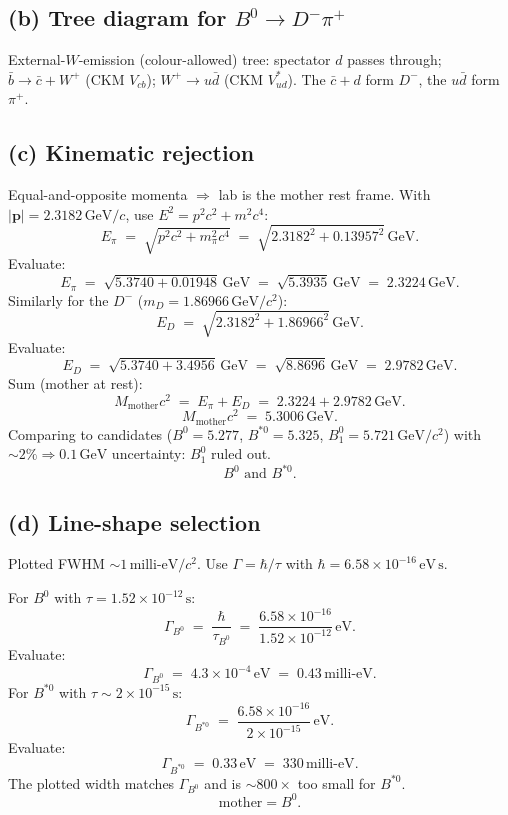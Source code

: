 \documentclass[11pt]{article}
\begin{document}
\subsection*{(b) Tree diagram for $B^{0}\to D^{-}\pi^{+}$}

External-$W$-emission (colour-allowed) tree: spectator $d$ passes through; $\bar b\to\bar c+W^{+}$ (CKM $V_{cb}$); $W^{+}\to u\bar d$ (CKM $V_{ud}^{*}$). The $\bar c+d$ form $D^{-}$, the $u\bar d$ form $\pi^{+}$.

\subsection*{(c) Kinematic rejection}

Equal-and-opposite momenta $\Rightarrow$ lab is the mother rest frame. With $|\bm p|=2.3182\,\text{GeV}/c$, use $E^{2}=p^{2}c^{2}+m^{2}c^{4}$:
\[
E_\pi\;=\;\sqrt{p^{2}c^{2}+m_\pi^{2}c^{4}}\;=\;\sqrt{2.3182^{2}+0.13957^{2}}\,\text{GeV}.
\]
Evaluate:
\[
E_\pi\;=\;\sqrt{5.3740+0.01948}\,\text{GeV}\;=\;\sqrt{5.3935}\,\text{GeV}\;=\;2.3224\,\text{GeV}.
\]
Similarly for the $D^{-}$ ($m_D=1.86966\,\text{GeV}/c^{2}$):
\[
E_D\;=\;\sqrt{2.3182^{2}+1.86966^{2}}\,\text{GeV}.
\]
Evaluate:
\[
E_D\;=\;\sqrt{5.3740+3.4956}\,\text{GeV}\;=\;\sqrt{8.8696}\,\text{GeV}\;=\;2.9782\,\text{GeV}.
\]
Sum (mother at rest):
\[
M_\text{mother}c^{2}\;=\;E_\pi+E_D\;=\;2.3224+2.9782\,\text{GeV}.
\]
\begin{equation}
M_\text{mother}c^{2}\;=\;\boxed{5.3006\,\text{GeV}}.
\end{equation}
Comparing to candidates ($B^{0}=5.277$, $B^{*0}=5.325$, $B^{0}_{1}=5.721\,\text{GeV}/c^{2}$) with $\sim 2\%\Rightarrow 0.1\,\text{GeV}$ uncertainty: $B^{0}_{1}$ ruled out.
\begin{equation}
\boxed{\,B^{0}\text{ and }B^{*0}.\,}
\end{equation}

\subsection*{(d) Line-shape selection}

Plotted FWHM $\sim 1\,\text{milli-eV}/c^{2}$. Use $\Gamma=\hbar/\tau$ with $\hbar=6.58\times 10^{-16}\,\text{eV}\,\text{s}$.

For $B^{0}$ with $\tau=1.52\times 10^{-12}\,\text{s}$:
\[
\Gamma_{B^{0}}\;=\;\frac{\hbar}{\tau_{B^{0}}}\;=\;\frac{6.58\times 10^{-16}}{1.52\times 10^{-12}}\,\text{eV}.
\]
Evaluate:
\begin{equation}
\Gamma_{B^{0}}\;=\;4.3\times 10^{-4}\,\text{eV}\;=\;0.43\,\text{milli-eV}.
\end{equation}
For $B^{*0}$ with $\tau\sim 2\times 10^{-15}\,\text{s}$:
\[
\Gamma_{B^{*0}}\;=\;\frac{6.58\times 10^{-16}}{2\times 10^{-15}}\,\text{eV}.
\]
Evaluate:
\begin{equation}
\Gamma_{B^{*0}}\;=\;0.33\,\text{eV}\;=\;330\,\text{milli-eV}.
\end{equation}
The plotted width matches $\Gamma_{B^{0}}$ and is $\sim 800\times$ too small for $B^{*0}$.
\begin{equation}
\boxed{\;\text{mother}=B^{0}.\;}
\end{equation}
\end{document}
